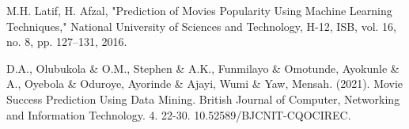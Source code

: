 \documentclass[conference]{IEEEtran}
\begin{document}
\begin{thebibliography}{1}
    M.H. Latif, H. Afzal, "Prediction of Movies Popularity Using Machine Learning Techniques," National University of Sciences and Technology, H-12, ISB, vol. 16, no. 8, pp. 127–131, 2016.
    
    D.A., Olubukola \& O.M., Stephen \& A.K., Funmilayo \& Omotunde, Ayokunle \& A., Oyebola \& Oduroye, Ayorinde \& Ajayi, Wumi \& Yaw, Mensah. (2021). Movie Success Prediction Using Data Mining. British Journal of Computer, Networking and Information Technology. 4. 22-30. 10.52589/BJCNIT-CQOCIREC. 

\end{thebibliography}
\end{document}
